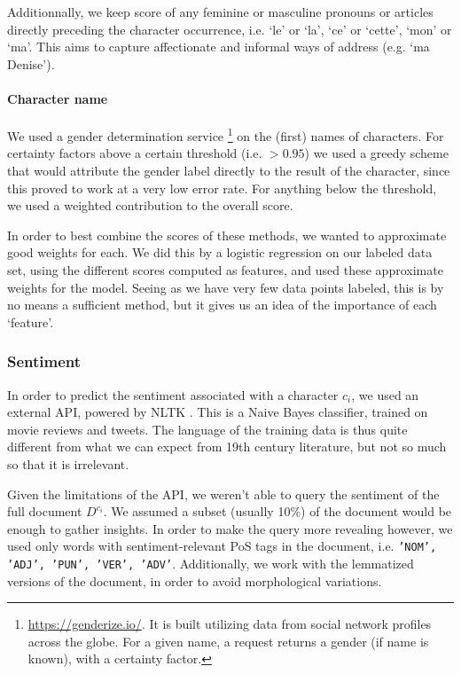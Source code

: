 Additionnally, we keep score of any feminine or masculine pronouns or articles directly preceding the character occurrence, i.e. `le' or `la', `ce' or `cette', `mon' or `ma'. This aims to capture affectionate and informal ways of address (e.g. `ma Denise').

\paragraph{Character name}
We used a gender determination service \footnote{\href{https://genderize.io/}{https://genderize.io/}. It is built utilizing data from social network profiles across the globe. For a given name, a request returns a gender (if name is known), with a certainty factor.} on the (first) names of characters. For certainty factors above a certain threshold (i.e. $> 0.95$) we used a greedy scheme that would attribute the gender label directly to the result of the character, since this proved to work at a very low error rate. For anything below the threshold, we used a weighted contribution to the overall score.
\vspace*{1em}

In order to best combine the scores of these methods, we wanted to approximate good weights for each. We did this by a logistic regression on our labeled data set, using the different scores computed as features, and used these approximate weights for the model. Seeing as we have very few data points labeled, this is by no means a sufficient method, but it gives us an idea of the importance of each `feature'.

\subsubsection{Sentiment} \label{sssec:sentiment}
In order to predict the sentiment associated with a character $c_i$, we used an external API, powered by NLTK \cite{perkins2010textclass}. This is a Naive Bayes classifier, trained on movie reviews and tweets. The language of the training data is thus quite different from what we can expect from 19th century literature, but not so much so that it is irrelevant.

Given the limitations of the API, we weren't able to query the sentiment of the full document $D^{c_i}$. We assumed a subset (usually 10\%) of the document would be enough to gather insights. In order to make the query more revealing however, we used only words with sentiment-relevant PoS tags in the document, i.e. \texttt{'NOM', 'ADJ', 'PUN', 'VER', 'ADV'}. Additionally, we work with the lemmatized versions of the document, in order to avoid morphological variations.

